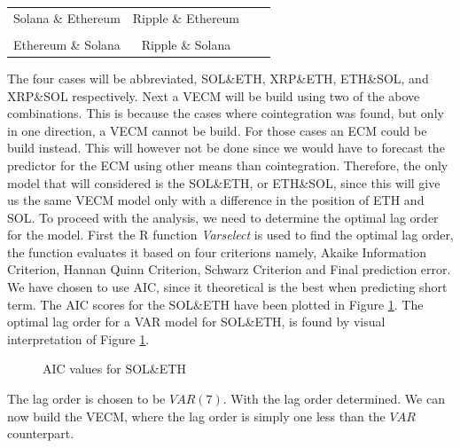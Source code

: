 \pause
\begin{center}
\begin{tabular}{cccc}
   Solana \& Ethereum \quad & \quad Ripple \& Ethereum\\\\
   Ethereum \& Solana \quad & \quad Ripple \& Solana
\end{tabular}
\end{center}
\pause
\noindent The four cases will be abbreviated, SOL\&ETH, XRP\&ETH, ETH\&SOL, and XRP\&SOL respectively. Next a VECM will be build using two of the above combinations. This is because the cases where cointegration was found, but only in one direction, a VECM cannot be build. For those cases an ECM could be build instead. This will however not be done since we would have to forecast the predictor for the ECM using other means than cointegration. Therefore, the only model that will considered is the SOL\&ETH, or ETH\&SOL, since this will give us the same VECM model only with a difference in the position of ETH and SOL. To proceed with the analysis, we need to determine the optimal lag order for the model. First the R function \textit{Varselect} is used to find the optimal lag order, the function evaluates it based on four criterions namely, Akaike Information Criterion, Hannan Quinn Criterion, Schwarz Criterion and Final prediction error. We have chosen to use AIC, since it theoretical is the best when predicting short term. The AIC scores for the SOL\&ETH have been plotted in Figure \ref{fig:AIC_plots}. The optimal lag order for a VAR model for SOL\&ETH, is found by visual interpretation of Figure \ref{fig:AIC_plots}.
\begin{figure}[H]
  \centering
  \quad
  
  \caption{AIC values for SOL\&ETH}
  \label{fig:AIC_plots}
\end{figure}
\noindent The lag order is chosen to be $VAR(7)$. With the lag order determined. We can now build the VECM, where the lag order is simply one less than the $VAR$ counterpart.

